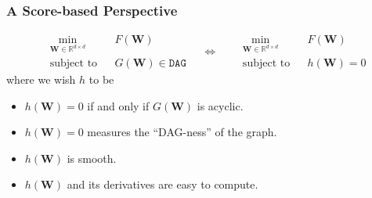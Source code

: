 \documentclass[10pt]{beamer}
\begin{document}
\begin{frame}
    \frametitle{A Score-based Perspective}
    \begin{equation*}
    \begin{aligned}
        &\min_{\mathbf{W} \in \mathbb{R}^{d \times d}}  & & F(\mathbf{W}) \\
        &\text{subject to} && G(\mathbf{W}) \in \texttt{DAG}
    \end{aligned}
    \quad 
    \Leftrightarrow
    \quad 
    \begin{aligned}
        &\min_{\mathbf{W} \in \mathbb{R}^{d \times d}}  & & F(\mathbf{W}) \\
        &\text{subject to} && h(\mathbf{W}) = 0
    \end{aligned}
    \end{equation*}
    where we wish $h$ to be
    \begin{itemize}
        \item $h(\mathbf{W}) = 0$ if and only if $G(\mathbf{W})$ is acyclic.
        \item $h(\mathbf{W}) = 0$ measures the ``DAG-ness'' of the graph.
        \item $h(\mathbf{W})$ is smooth.
        \item $h(\mathbf{W})$ and its derivatives are easy to compute.
    \end{itemize}
\end{frame}
\end{document}

